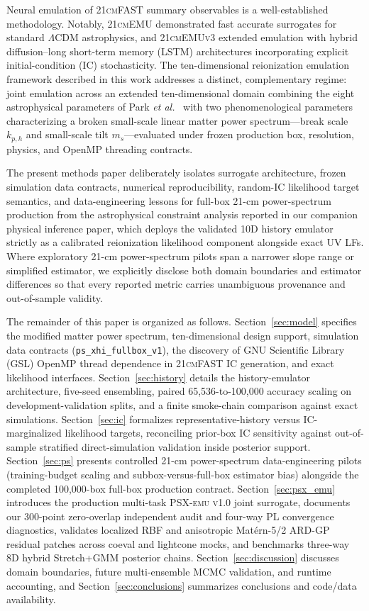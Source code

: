 \documentclass[aps,prd,reprint,superscriptaddress,nofootinbib,amsmath,amssymb,floatfix,longbibliography]{revtex4-2}
\begin{document}
Neural emulation of \textsc{21cmFAST} summary observables is a well-established methodology. Notably, \textsc{21cmEMU} \cite{Breitman2024} demonstrated fast accurate surrogates for standard $\Lambda$CDM astrophysics, and \textsc{21cmEMUv3} \cite{Breitman2026} extended emulation with hybrid diffusion--long short-term memory (LSTM) architectures incorporating explicit initial-condition (IC) stochasticity. The ten-dimensional reionization emulation framework described in this work addresses a distinct, complementary regime: joint emulation across an extended ten-dimensional domain combining the eight astrophysical parameters of Park \textit{et al.}~\cite{Park2019} with two phenomenological parameters characterizing a broken small-scale linear matter power spectrum---break scale $k_{p,h}$ and small-scale tilt $m_s$---evaluated under frozen production box, resolution, physics, and OpenMP threading contracts.

The present methods paper deliberately isolates surrogate architecture, frozen simulation data contracts, numerical reproducibility, random-IC likelihood target semantics, and data-engineering lessons for full-box 21-cm power-spectrum production from the astrophysical constraint analysis reported in our companion physical inference paper, which deploys the validated 10D history emulator strictly as a calibrated reionization likelihood component alongside exact UV LFs. Where exploratory 21-cm power-spectrum pilots span a narrower slope range or simplified estimator, we explicitly disclose both domain boundaries and estimator differences so that every reported metric carries unambiguous provenance and out-of-sample validity.

The remainder of this paper is organized as follows. Section~\ref{sec:model} specifies the modified matter power spectrum, ten-dimensional design support, simulation data contracts (\texttt{ps\_xhi\_fullbox\_v1}), the discovery of GNU Scientific Library (GSL) OpenMP thread dependence in \textsc{21cmFAST} IC generation, and exact likelihood interfaces. Section~\ref{sec:history} details the history-emulator architecture, five-seed ensembling, paired 65,536-to-100,000 accuracy scaling on development-validation splits, and a finite smoke-chain comparison against exact simulations. Section~\ref{sec:ic} formalizes representative-history versus IC-marginalized likelihood targets, reconciling prior-box IC sensitivity against out-of-sample stratified direct-simulation validation inside posterior support. Section~\ref{sec:ps} presents controlled 21-cm power-spectrum data-engineering pilots (training-budget scaling and subbox-versus-full-box estimator bias) alongside the completed 100,000-box full-box production contract. Section~\ref{sec:psx_emu} introduces the production multi-task \textsc{PSX-emu v1.0} joint surrogate, documents our 300-point zero-overlap independent audit and four-way PL convergence diagnostics, validates localized RBF and anisotropic Mat\'ern-5/2 ARD-GP residual patches across coeval and lightcone mocks, and benchmarks three-way 8D hybrid Stretch+GMM posterior chains. Section~\ref{sec:discussion} discusses domain boundaries, future multi-ensemble MCMC validation, and runtime accounting, and Section~\ref{sec:conclusions} summarizes conclusions and code/data availability.
\end{document}
